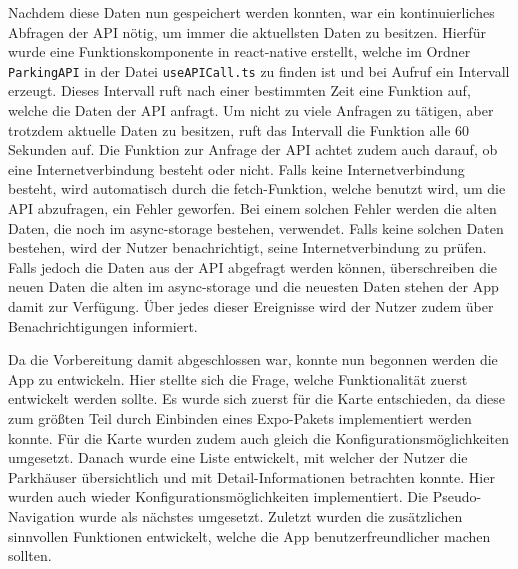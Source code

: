 Nachdem diese Daten nun gespeichert werden konnten, war ein kontinuierliches Abfragen der API nötig, um immer die aktuellsten Daten zu besitzen. Hierfür wurde eine Funktionskomponente in react-native erstellt, welche im Ordner \verb|ParkingAPI| in der Datei \verb|useAPICall.ts| zu finden ist und bei Aufruf ein Intervall erzeugt. Dieses Intervall ruft nach einer bestimmten Zeit eine Funktion auf, welche die Daten der API anfragt. Um nicht zu viele Anfragen zu tätigen, aber trotzdem aktuelle Daten zu besitzen, ruft das Intervall die Funktion alle 60 Sekunden auf. Die Funktion zur Anfrage der API achtet zudem auch darauf, ob eine Internetverbindung besteht oder nicht. Falls keine Internetverbindung besteht, wird automatisch durch die fetch-Funktion, welche benutzt wird, um die API abzufragen, ein Fehler geworfen. Bei einem solchen Fehler werden die alten Daten, die noch im async-storage bestehen, verwendet. Falls keine solchen Daten bestehen, wird der Nutzer benachrichtigt, seine Internetverbindung zu prüfen. Falls jedoch die Daten aus der API abgefragt werden können, überschreiben die neuen Daten die alten im async-storage und die neuesten Daten stehen der App damit zur Verfügung. Über jedes dieser Ereignisse wird der Nutzer zudem über Benachrichtigungen informiert.

Da die Vorbereitung damit abgeschlossen war, konnte nun begonnen werden die App zu entwickeln. Hier stellte sich die Frage, welche Funktionalität zuerst entwickelt werden sollte. Es wurde sich zuerst für die Karte entschieden, da diese zum größten Teil durch Einbinden eines Expo-Pakets implementiert werden konnte. Für die Karte wurden zudem auch gleich die Konfigurationsmöglichkeiten umgesetzt. Danach wurde eine Liste entwickelt, mit welcher der Nutzer die Parkhäuser übersichtlich und mit Detail-Informationen betrachten konnte. Hier wurden auch wieder Konfigurationsmöglichkeiten implementiert. Die Pseudo-Navigation wurde als nächstes umgesetzt. Zuletzt wurden die zusätzlichen sinnvollen Funktionen entwickelt, welche die App benutzerfreundlicher machen sollten.
%
%
